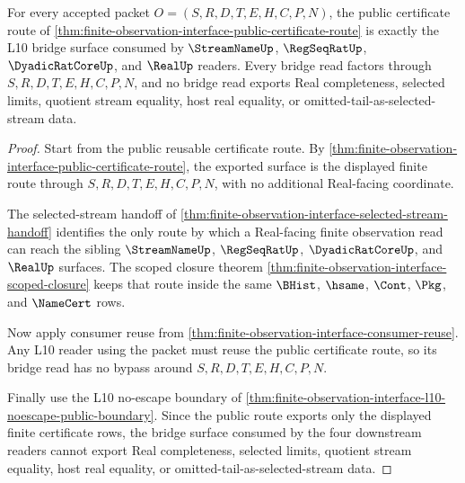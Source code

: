 \begin{theorem}
\label{thm:finite-observation-interface-l10-bridge}
For every accepted packet $O=(S,R,D,T,E,H,C,P,N)$, the public certificate route of \autoref{thm:finite-observation-interface-public-certificate-route} is exactly the L10 bridge surface consumed by $\StreamNameUp$, $\RegSeqRatUp$, $\DyadicRatCoreUp$, and $\RealUp$ readers. Every bridge read factors through $S,R,D,T,E,H,C,P,N$, and no bridge read exports Real completeness, selected limits, quotient stream equality, host real equality, or omitted-tail-as-selected-stream data.
\end{theorem}
\begin{proof}
Start from the public reusable certificate route. By \autoref{thm:finite-observation-interface-public-certificate-route}, the exported surface is the displayed finite route through $S,R,D,T,E,H,C,P,N$, with no additional Real-facing coordinate.

The selected-stream handoff of \autoref{thm:finite-observation-interface-selected-stream-handoff} identifies the only route by which a Real-facing finite observation read can reach the sibling $\StreamNameUp$, $\RegSeqRatUp$, $\DyadicRatCoreUp$, and $\RealUp$ surfaces. The scoped closure theorem \autoref{thm:finite-observation-interface-scoped-closure} keeps that route inside the same $\BHist$, $\hsame$, $\Cont$, $\Pkg$, and $\NameCert$ rows.

Now apply consumer reuse from \autoref{thm:finite-observation-interface-consumer-reuse}. Any L10 reader using the packet must reuse the public certificate route, so its bridge read has no bypass around $S,R,D,T,E,H,C,P,N$.

Finally use the L10 no-escape boundary of \autoref{thm:finite-observation-interface-l10-noescape-public-boundary}. Since the public route exports only the displayed finite certificate rows, the bridge surface consumed by the four downstream readers cannot export Real completeness, selected limits, quotient stream equality, host real equality, or omitted-tail-as-selected-stream data.
\end{proof}



